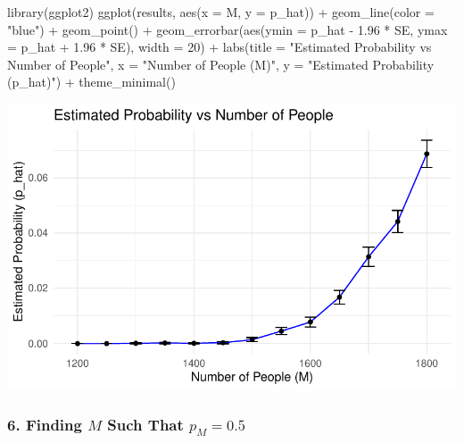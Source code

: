 \documentclass[
  letterpaper,
  DIV=11,
  numbers=noendperiod]{scrartcl}
\newenvironment{Shaded}{\begin{snugshade}}{\end{snugshade}}
\newcommand{\AttributeTok}[1]{\textcolor[rgb]{0.98,0.46,0.51}{#1}}
\newcommand{\DecValTok}[1]{\textcolor[rgb]{0.47,0.72,1.00}{#1}}
\newcommand{\FloatTok}[1]{\textcolor[rgb]{0.47,0.72,1.00}{#1}}
\newcommand{\FunctionTok}[1]{\textcolor[rgb]{0.70,0.57,0.94}{#1}}
\newcommand{\NormalTok}[1]{\textcolor[rgb]{0.88,0.89,0.91}{#1}}
\newcommand{\SpecialCharTok}[1]{\textcolor[rgb]{0.47,0.72,1.00}{#1}}
\newcommand{\StringTok}[1]{\textcolor[rgb]{0.62,0.80,1.00}{#1}}
\begin{document}
\begin{Shaded}
\begin{Highlighting}[]
\FunctionTok{library}\NormalTok{(ggplot2)}
\FunctionTok{ggplot}\NormalTok{(results, }\FunctionTok{aes}\NormalTok{(}\AttributeTok{x =}\NormalTok{ M, }\AttributeTok{y =}\NormalTok{ p\_hat)) }\SpecialCharTok{+}
  \FunctionTok{geom\_line}\NormalTok{(}\AttributeTok{color =} \StringTok{"blue"}\NormalTok{) }\SpecialCharTok{+}
  \FunctionTok{geom\_point}\NormalTok{() }\SpecialCharTok{+}
  \FunctionTok{geom\_errorbar}\NormalTok{(}\FunctionTok{aes}\NormalTok{(}\AttributeTok{ymin =}\NormalTok{ p\_hat }\SpecialCharTok{{-}} \FloatTok{1.96} \SpecialCharTok{*}\NormalTok{ SE, }\AttributeTok{ymax =}\NormalTok{ p\_hat }\SpecialCharTok{+} \FloatTok{1.96} \SpecialCharTok{*}\NormalTok{ SE), }\AttributeTok{width =} \DecValTok{20}\NormalTok{) }\SpecialCharTok{+}
  \FunctionTok{labs}\NormalTok{(}\AttributeTok{title =} \StringTok{"Estimated Probability vs Number of People"}\NormalTok{,}
       \AttributeTok{x =} \StringTok{"Number of People (M)"}\NormalTok{,}
       \AttributeTok{y =} \StringTok{"Estimated Probability (p\_hat)"}\NormalTok{) }\SpecialCharTok{+}
  \FunctionTok{theme\_minimal}\NormalTok{()}
\end{Highlighting}
\end{Shaded}

\includegraphics{Homework-4-BCA_files/figure-pdf/unnamed-chunk-6-1.pdf}

\subsubsection{\texorpdfstring{6. Finding \(M\) Such That
\(p_M = 0.5\)}{6. Finding M Such That p\_M = 0.5}}\label{finding-m-such-that-p_m-0.5}
\end{document}
